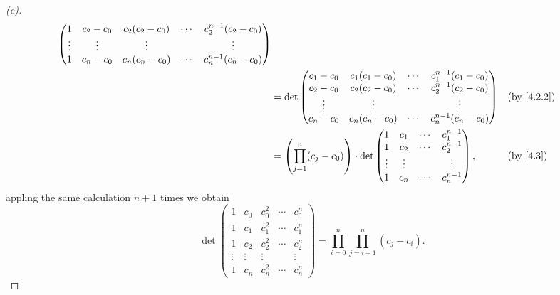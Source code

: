 \begin{proof}[(c)]
\begin{align*}
\begin{pmatrix}
               1      & c_2 - c_0 & c_2 (c_2 - c_0) & \cdots & c_2^{n - 1} (c_2 - c_0) \\
               \vdots & \vdots    & \vdots          &        & \vdots                  \\
               1      & c_n - c_0 & c_n (c_n - c_0) & \cdots & c_n^{n - 1} (c_n - c_0)
             \end{pmatrix}           \\
     & = \det\begin{pmatrix}
               c_1 - c_0 & c_1 (c_1 - c_0) & \cdots & c_1^{n - 1} (c_1 - c_0) \\
               c_2 - c_0 & c_2 (c_2 - c_0) & \cdots & c_2^{n - 1} (c_2 - c_0) \\
               \vdots    & \vdots          &        & \vdots                  \\
               c_n - c_0 & c_n (c_n - c_0) & \cdots & c_n^{n - 1} (c_n - c_0)
             \end{pmatrix}          &  & \by{4.2.2}                    \\
     & = \pa{\prod_{j = 1}^n (c_j - c_0)} \cdot \det\begin{pmatrix}
                                                      1      & c_1    & \cdots & c_1^{n - 1} \\
                                                      1      & c_2    & \cdots & c_2^{n - 1} \\
                                                      \vdots & \vdots &        & \vdots      \\
                                                      1      & c_n    & \cdots & c_n^{n - 1}
                                                    \end{pmatrix},               &  & \by{4.3}
  \end{align*}
  appling the same calculation \(n + 1\) times we obtain
  \[
    \det\begin{pmatrix}
      1      & c_0    & c_0^2  & \cdots & c_0^n  \\
      1      & c_1    & c_1^2  & \cdots & c_1^n  \\
      1      & c_2    & c_2^2  & \cdots & c_2^n  \\
      \vdots & \vdots & \vdots &        & \vdots \\
      1      & c_n    & c_n^2  & \cdots & c_n^n
    \end{pmatrix} = \prod_{i = 0}^n \prod_{j = i + 1}^n (c_j - c_i).
  \]
\end{proof}

